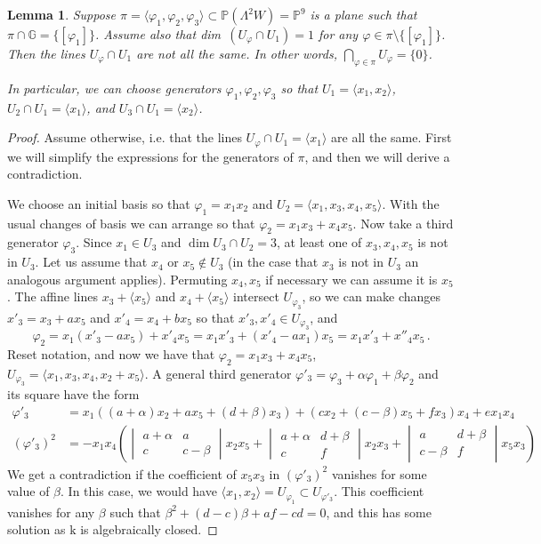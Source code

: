 \documentclass[10pt,reqno]{amsart}
\newcommand{\la}{\langle}
\newcommand{\ra}{\rangle}
\newcommand{\GG}{\mathbb{G}}
\newcommand{\PP}{\mathbb P}
\renewcommand{\a}{\alpha}
\renewcommand{\b}{\beta}
\newcommand{\f}{\varphi}
\renewcommand{\L}{\Lambda}
\newcommand{\kk}{\mathrm{k}}
\newtheorem{lemma}[theorem]{Lemma}
\theoremstyle{definition}
\begin{document}
\begin{lemma} \label{lem:case16-not-same-line} 
Suppose $\pi =\la \f_1, \f_2, \f_3 \ra \subset \PP(\L^2 W)=\PP^9$ is a plane such that $\pi \cap \GG=\{[\f_1]\}$. Assume also that dim~$(U_{\f} \cap U_1)=1$ for any $\f \in \pi \setminus \{[\f_1]\}$. Then the lines $U_{\f} \cap U_1$ are not all the same. In other words, $\bigcap_{\f \in \pi} U_{\f}=\{0\}$. 

\noindent In particular, we can choose generators $\f_1, \f_2, \f_3$ so that $U_1=\la x_1, x_2 \ra$, $U_2 \cap U_1=\la x_1 \ra$, and $U_3 \cap U_1=\la x_2 \ra$.
\end{lemma}
\begin{proof}
Assume otherwise, i.e. that the lines $U_{\f} \cap U_1=\la x_1 \ra$ are all the same.
First we will simplify the expressions for the generators of $\pi$, and then we will derive a contradiction. 

\noindent We choose an initial basis so that $\f_1=x_1x_2$ and $U_2=\la x_1, x_3, x_4, x_5 \ra$. With the usual changes of basis we can arrange so that $\f_2=x_1x_3+x_4x_5$. Now take a third generator $\f_3$. Since $x_1 \in U_3$ and $\dim U_3 \cap U_2=3$, at least one of $x_3,x_4, x_5$ is not in $U_3$. 
Let us assume that $x_4$ or $x_5 \notin U_3$ (in the case that $x_3$ is not in $U_3$ an analogous argument applies). Permuting $x_4, x_5$ if necessary we can assume it is $x_5$. The affine lines $x_3 + \la x_5 \ra$ and $x_4+ \la x_5 \ra$ intersect $U_{\f_3}$, so we can make changes $x'_3=x_3+ax_5$ and $x'_4=x_4+bx_5$ so that $x'_3, x'_4 \in U_{\f_3}$, and 
\[
\f_2=x_1(x'_3-ax_5)+x'_4x_5=x_1x'_3+(x'_4-ax_1)x_5=x_1x'_3+x''_4x_5 \, .
\]
Reset notation, and now we have that $\f_2=x_1x_3+x_4x_5$, $U_{\f_3}=\la x_1, x_3,x_4, x_2+x_5\ra$. A general third generator $\f'_3=\f_3+\a \f_1+\b \f_2$ and its square have the form
\begin{align*}
\f'_3&=x_1((a+\a)x_2+ax_5+(d+\b)x_3)+(cx_2+(c-\b)x_5+fx_3)x_4+ex_1x_4 \\
(\f'_3)^2&=-x_1x_4 
\left( 
\begin{vmatrix}
    a+\a & a \\
    c & c-\b 
\end{vmatrix}  
x_2x_5 + 
\begin{vmatrix}
    a+\a & d+\b \\
    c & f 
\end{vmatrix}  
x_2x_3 + 
\begin{vmatrix}
    a & d+\b \\
    c-\b & f 
\end{vmatrix}  
x_5x_3
\right)
\end{align*}
We get a contradiction if the coefficient of $x_5x_3$ in $(\f'_3)^2$ vanishes for some value of $\b$. In this case, we would have $\la x_1, x_2 \ra =U_{\f_1} \subset U_{\f'_3}$.
This coefficient vanishes for any $\b$ such that $\b^2+(d-c)\b +af-cd=0$, and this has some solution as $\kk$ is algebraically closed.
\end{proof}
\end{document}
